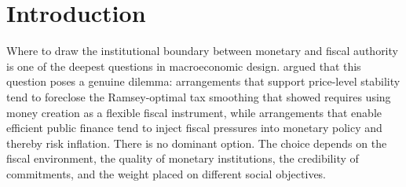 \documentclass[12pt]{article}
\begin{document}
\begin{abstract}
wage-price controls, and declared himself ``a Keynesian in economics.''
The essay also turns from individual reversals to institutional ones:
the half-century redrawing of the line between \emph{money} and
\emph{credit}, from the bond-backed currency of the National Banking
Acts that Chase championed to the real-bills provisions of the Federal
Reserve Act of 1913; and, as a British parallel, the story of Robert
Peel's Bank Charter Act of 1844 and its three suspensions---a statutory
line bent, not repealed, by the logic of acute financial crisis, and the
occasion for Bagehot's inversion of Currency School orthodoxy.  These
reversals are not signs of weakness or inconsistency; they are evidence
of how contextually sensitive, and how consequential, the institutional
lines really are.  They also reveal a structural pattern: reversals
cluster at moments of systemic stress---wars, panics, and
depressions---when the costs of the existing institutional arrangement
suddenly become undeniable to multiple actors at once.
\end{abstract}

\tableofcontents
\bigskip

\section{Introduction}

Where to draw the institutional boundary between monetary and fiscal
authority is one of the deepest questions in macroeconomic design.
\citet{Sargent2011} argued that this question poses a genuine dilemma:
arrangements that support price-level stability tend to foreclose the
Ramsey-optimal tax smoothing that \citet{LucasStokey1983} showed
requires using money creation as a flexible fiscal instrument, while
arrangements that enable efficient public finance tend to inject fiscal
pressures into monetary policy and thereby risk inflation.  There is no
dominant option.  The choice depends on the fiscal environment,
the quality of monetary institutions, the credibility of commitments,
and the weight placed on different social objectives.
\end{document}

